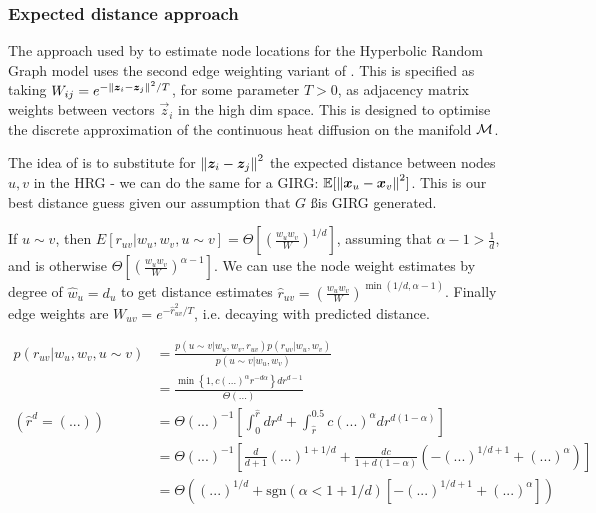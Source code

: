 \subsubsection{Expected distance approach}
The approach used by \cite{garcia2019mercator} to estimate node locations for the Hyperbolic Random Graph model uses the second  edge weighting variant of \cite{belkin2001laplacian}. This is specified as taking $W_{ij} = e^{-\left\lVert \bm{z}_i - \bm{z}_j\right\rVert^2 / T}$, for some parameter $T > 0$, as adjacency matrix weights between vectors $\vec{z}_i$ in the high dim space. This is designed to optimise the discrete approximation of the continuous heat diffusion on the manifold $\mathcal{M}$.

The idea of \cite{garcia2019mercator} is to substitute for $\left\lVert \bm{z}_i - \bm{z}_j\right\rVert^2$ the expected distance between nodes $u, v$ in the HRG - we can do the same for a GIRG: $\mathbb{E}[\left\lVert \bm{x}_u - \bm{x}_v\right\rVert^2]$. This is our best distance guess given our assumption that $G$ ßis GIRG generated.

If $u \sim v$, then  $E[r_{uv} | w_u, w_v, u \sim v] = \Theta \left [ \left ( \frac{w_u w_v}{W} \right )^{1/d} \right ]$, assuming that $\alpha - 1 > \frac{1}{d}$, and is otherwise $\Theta \left [ \left( \frac{w_u w_v}{W} \right )^{\alpha - 1} \right ]$. We can use the node weight estimates by degree of $\hat{w}_u = d_u$ to get distance estimates $\hat{r}_{uv} = \left ( \frac{w_u w_v}{W} \right )^{\min(1/d, \alpha - 1)}$. Finally edge weights are $W_{uv} = e^{-\hat{r}_{uv}^2 / T}$, i.e. decaying with predicted distance.

\begin{align*}
p(r_{uv} | w_u, w_v, u \sim v) 
&= \frac{p(u \sim v | w_u, w_v, r_{uv}) p(r_{uv} | w_u, w_v)}{p(u \sim v | w_u, w_v)} \\
&= \frac{\min \left \{ 1, c (...)^\alpha r^{-d \alpha} \right \} d r^{d-1}}{\Theta(...)}
\\
(\hat{r}^d = (...))\quad &= \Theta(...)^{-1} \left [ \int_0^{\hat{r}} d r^d + \int_{\hat{r}}^{0.5} c (...)^\alpha d r^{d(1 - \alpha)} \right ]
\\
&= \Theta(...)^{-1} \left [ \frac{d}{d+1} (...)^{1 + 1/d} 
+  \frac{dc}{1 + d(1-\alpha)} \left ( 
  -(...)^{1/d + 1}  + (...)^{\alpha}
\right )
\right ]
\\
&= \Theta \left (
    (...)^{1/d} + \text{sgn}(\alpha < 1 + 1/d) \left [ 
      -(...)^{1/d + 1}  + (...)^{\alpha}  
    \right ]
\right )
\end{align*}


